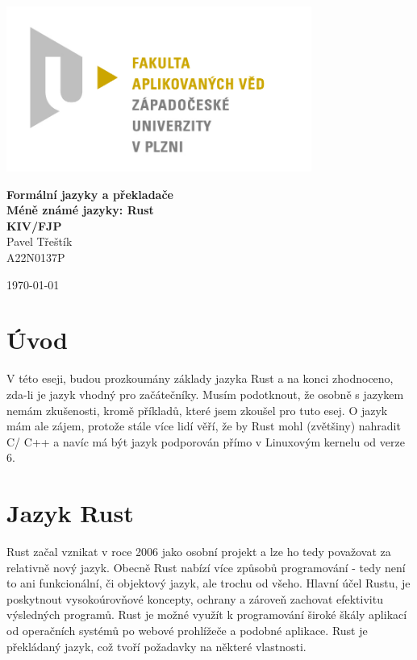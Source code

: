\documentclass[12pt, letterpaper]{article}
\begin{document}
\begin{titlepage}
\centerline{\includegraphics[width=10cm]{img/logo.jpg}}
\begin{center}
\vspace{30px}
{\huge
\textbf{Formální jazyky a překladače}\\
\textbf{Méně známé jazyky: Rust}\\
\vspace{1cm}
}
{\large
\textbf{KIV/FJP}\\
\vspace{1cm}
}
\vspace{1cm}
{\large
Pavel Třeštík\\
}
{\normalsize
A22N0137P
}
\end{center}
\vspace{\fill}
\hfill
\begin{minipage}[t]{7cm}
\flushright
\today
\end{minipage}
\end{titlepage}
\section{Úvod}
V této eseji, budou prozkoumány základy jazyka Rust a na konci zhodnoceno, zda-li je jazyk vhodný pro 
začátečníky. Musím podotknout, že osobně s jazykem nemám zkušenosti, kromě příkladů, které jsem zkoušel
pro tuto esej. O jazyk mám ale zájem, protože stále více lidí věří, že by Rust mohl (zvětšiny) nahradit 
C/ C++ a navíc má být jazyk podporován přímo v Linuxovým kernelu od verze 6.
%
\section{Jazyk Rust}
Rust začal vznikat v roce 2006 jako osobní projekt a lze ho tedy považovat za relativně nový jazyk.
Obecně Rust nabízí více způsobů programování - tedy není to ani funkcionální, či
objektový jazyk, ale trochu od všeho. Hlavní účel Rustu, je poskytnout vysokoúrovňové koncepty,
ochrany a zároveň zachovat efektivitu výsledných programů. Rust je možné využít k programování široké
škály aplikací od operačních systémů po webové prohlížeče a podobné aplikace. Rust je překládaný jazyk,
což tvoří požadavky na některé vlastnosti.
%
\end{document}
